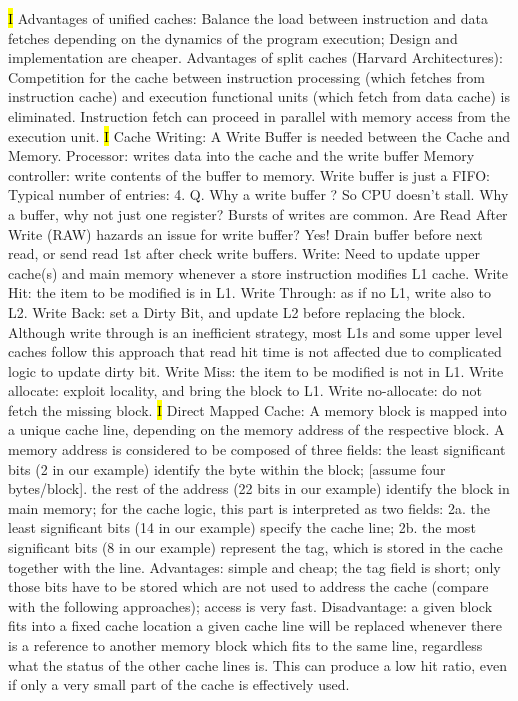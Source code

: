 \documentclass[fontsize=4pt]{scrartcl}
\begin{document}
\hl{I}
Advantages of unified caches: Balance the load between instruction and data fetches depending on the dynamics of the program execution; Design and implementation are cheaper. Advantages of split caches (Harvard Architectures): Competition for the cache between instruction processing (which fetches from instruction cache) and execution functional units (which fetch from data cache) is eliminated. Instruction fetch can proceed in parallel with memory access from the execution unit.
\hl{I}
Cache Writing: A Write Buffer is needed between the Cache and Memory. Processor: writes data into the cache and the write buffer
Memory controller: write contents of the buffer to memory. Write buffer is just a FIFO: Typical number of entries: 4. Q. Why a write buffer ? So CPU doesn’t stall. Why a buffer, why not just one register? Bursts of writes are common. Are Read After Write (RAW) hazards an issue for write buffer? Yes! Drain buffer before next read, or send read 1st after check write buffers. Write: Need to update upper cache(s) and main memory whenever a store instruction modifies L1 cache. Write Hit: the item to be modified is in L1. Write Through: as if no L1, write also to L2. Write Back: set a Dirty Bit, and update L2 before replacing the block.
Although write through is an inefficient strategy, most L1s and some upper level caches follow this approach that read hit time is not affected due to complicated logic to update dirty bit. Write Miss: the item to be modified is not in L1. Write allocate: exploit locality, and bring the block to L1. Write no-allocate: do not fetch the missing block.
\hl{I}
Direct Mapped Cache: A memory block is mapped into a unique cache line, depending on the memory address of the respective block.
A memory address is considered to be composed of three fields: the least significant bits (2 in our example) identify the byte within the block; [assume four bytes/block]. the rest of the address (22 bits in our example) identify the block in main memory; for the cache logic, this part is interpreted as two fields: 2a. the least significant bits (14 in our example) specify the cache line; 2b. the most significant bits (8 in our example) represent the tag, which is stored in the cache together with the line. Advantages: simple and cheap; the tag field is short; only those bits have to be stored which are not used to address the cache (compare with the following approaches); access is very fast. Disadvantage: a given block fits into a fixed cache location
a given cache line will be replaced whenever there is a reference to another memory block which fits to the same line, regardless what the status of the other cache lines is. This can produce a low hit ratio, even if only a very small part of the cache is effectively used.
\end{document}
